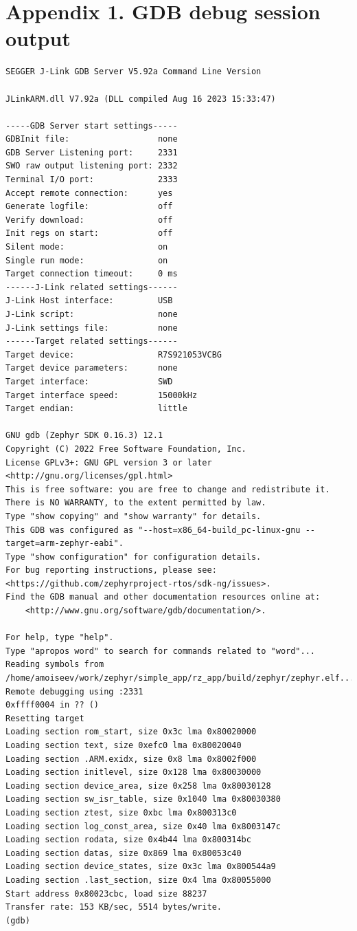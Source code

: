 \documentclass[11pt,a4paper,oneside]{article}
\begin{document}
\section*{Appendix 1. GDB debug session
output}\label{appendix-1.-gdb-debug-session-output}

\begin{lstlisting}
SEGGER J-Link GDB Server V5.92a Command Line Version

JLinkARM.dll V7.92a (DLL compiled Aug 16 2023 15:33:47)

-----GDB Server start settings-----
GDBInit file:                  none
GDB Server Listening port:     2331
SWO raw output listening port: 2332
Terminal I/O port:             2333
Accept remote connection:      yes
Generate logfile:              off
Verify download:               off
Init regs on start:            off
Silent mode:                   on
Single run mode:               on
Target connection timeout:     0 ms
------J-Link related settings------
J-Link Host interface:         USB
J-Link script:                 none
J-Link settings file:          none
------Target related settings------
Target device:                 R7S921053VCBG
Target device parameters:      none
Target interface:              SWD
Target interface speed:        15000kHz
Target endian:                 little

GNU gdb (Zephyr SDK 0.16.3) 12.1
Copyright (C) 2022 Free Software Foundation, Inc.
License GPLv3+: GNU GPL version 3 or later <http://gnu.org/licenses/gpl.html>
This is free software: you are free to change and redistribute it.
There is NO WARRANTY, to the extent permitted by law.
Type "show copying" and "show warranty" for details.
This GDB was configured as "--host=x86_64-build_pc-linux-gnu --target=arm-zephyr-eabi".
Type "show configuration" for configuration details.
For bug reporting instructions, please see:
<https://github.com/zephyrproject-rtos/sdk-ng/issues>.
Find the GDB manual and other documentation resources online at:
    <http://www.gnu.org/software/gdb/documentation/>.

For help, type "help".
Type "apropos word" to search for commands related to "word"...
Reading symbols from
/home/amoiseev/work/zephyr/simple_app/rz_app/build/zephyr/zephyr.elf...
Remote debugging using :2331
0xffff0004 in ?? ()
Resetting target
Loading section rom_start, size 0x3c lma 0x80020000
Loading section text, size 0xefc0 lma 0x80020040
Loading section .ARM.exidx, size 0x8 lma 0x8002f000
Loading section initlevel, size 0x128 lma 0x80030000
Loading section device_area, size 0x258 lma 0x80030128
Loading section sw_isr_table, size 0x1040 lma 0x80030380
Loading section ztest, size 0xbc lma 0x800313c0
Loading section log_const_area, size 0x40 lma 0x8003147c
Loading section rodata, size 0x4b44 lma 0x800314bc
Loading section datas, size 0x869 lma 0x80053c40
Loading section device_states, size 0x3c lma 0x800544a9
Loading section .last_section, size 0x4 lma 0x80055000
Start address 0x80023cbc, load size 88237
Transfer rate: 153 KB/sec, 5514 bytes/write.
(gdb)
\end{lstlisting}
\end{document}
